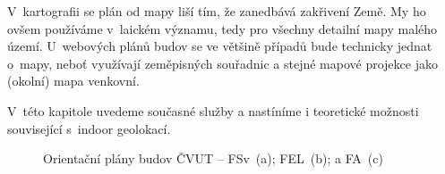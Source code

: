 V~kartografii se plán od mapy liší tím, že zanedbává zakřivení Země. My ho ovšem používáme v~laickém významu, tedy pro všechny detailní mapy malého území. U~webových plánů budov se ve většině případů bude technicky jednat o~mapy, neboť využívají zeměpisných souřadnic a stejné mapové projekce jako (okolní) mapa venkovní.

V~této kapitole uvedeme současné služby a nastíníme i teoretické možnosti související s~indoor geolokací.


                      \begin{figure}
                    	  \centering
                    \hfill
                    \hfill

                    \caption{Orientační plány budov ČVUT -- FSv\cite{zdroj3}~(a); FEL\cite{zdroj4}~(b); a FA\cite{zdroj5}~(c)}
                    \label{obr1}
                    \end{figure}
